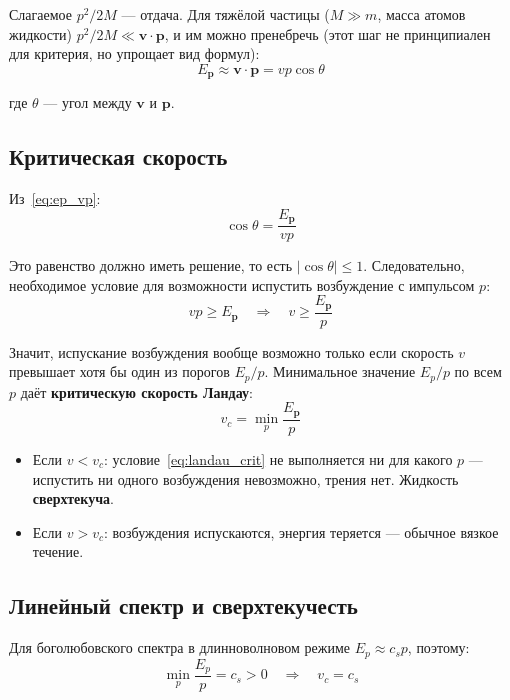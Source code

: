 \documentclass[../general/general]{subfiles}
\begin{document}
Слагаемое $p^2/2M$ --- отдача. Для тяжёлой частицы ($M \gg m$, масса атомов жидкости) $p^2/2M \ll \mathbf{v}\cdot\mathbf{p}$, и им можно пренебречь (этот шаг не принципиален для критерия, но упрощает вид формул):
\begin{equation}
    E_\mathbf{p} \approx \mathbf{v}\cdot\mathbf{p} = vp\cos\theta
    \label{eq:ep_vp}
\end{equation}

где $\theta$ --- угол между $\mathbf{v}$ и $\mathbf{p}$.

\subsection{Критическая скорость}

Из~\eqref{eq:ep_vp}:
\begin{equation}
    \cos\theta = \frac{E_\mathbf{p}}{vp}
\end{equation}

Это равенство должно иметь решение, то есть $|\cos\theta| \leq 1$. Следовательно, необходимое условие для возможности испустить возбуждение с импульсом $p$:
\begin{equation}
    vp \geq E_\mathbf{p} \quad \Rightarrow \quad v \geq \frac{E_\mathbf{p}}{p}
    \label{eq:landau_crit}
\end{equation}

Значит, испускание возбуждения вообще возможно только если скорость $v$ превышает хотя бы один из порогов $E_p/p$. Минимальное значение $E_p/p$ по всем $p$ даёт \textbf{критическую скорость Ландау}:
\begin{equation}
    \boxed{v_c = \min_p \frac{E_\mathbf{p}}{p}}
    \label{eq:vc}
\end{equation}

\begin{itemize}
    \item Если $v < v_c$: условие~\eqref{eq:landau_crit} не выполняется ни для какого $p$ --- испустить ни одного возбуждения невозможно, трения нет. Жидкость \textbf{сверхтекуча}.
    \item Если $v > v_c$: возбуждения испускаются, энергия теряется --- обычное вязкое течение.
\end{itemize}

\subsection{Линейный спектр и сверхтекучесть}

Для боголюбовского спектра в длинноволновом режиме $E_p \approx c_s p$, поэтому:
\begin{equation}
    \min_p \frac{E_p}{p} = c_s > 0
    \quad \Rightarrow \quad v_c = c_s
\end{equation}
\end{document}
